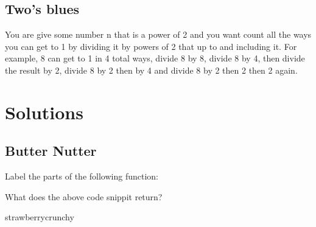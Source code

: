 \documentclass{article}
\begin{document}
\subsection{Two's blues}
You are give some number n that is  a power of 2 and you want count all the ways you can get to 1 by dividing it by powers of 2 that up to and including it. For example, 8 can get to 1 in 4 total ways, divide 8 by 8, divide 8 by 4, then divide the result by 2, divide 8 by 2 then by 4 and divide 8 by 2 then 2 then 2 again.

\newpage

\section{Solutions}
\subsection{Butter Nutter}
\begin{subq}
 \subqs Label the parts of the following function: 
 
  \bigskip
 
\begin{solution}


 \end{solution}
 \subqs What does the above code snippit return? 
 \begin{solution}
 strawberrycrunchy
 \end{solution}
\end{subq}
\end{document}
